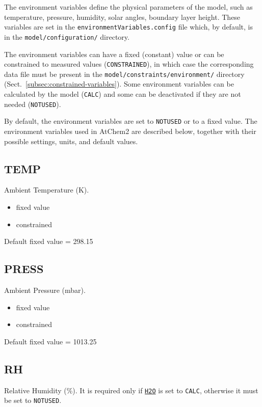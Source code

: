 The environment variables define the physical parameters of the model,
such as temperature, pressure, humidity, solar angles, boundary layer
height. These variables are set in the \texttt{environmentVariables.config}
file which, by default, is in the \texttt{model/configuration/}
directory.

The environment variables can have a fixed (constant) value or can be
constrained to measured values (\texttt{CONSTRAINED}), in which case
the corresponding data file must be present in the
\texttt{model/constraints/environment/} directory
(Sect.~\ref{subsec:constrained-variables}). Some environment variables
can be calculated by the model (\texttt{CALC}) and some can be
deactivated if they are not needed (\texttt{NOTUSED}).

By default, the environment variables are set to \texttt{NOTUSED} or
to a fixed value. The environment variables used in AtChem2 are
described below, together with their possible settings, units, and
default values.

\subsection{TEMP} \label{subsec:temp}

Ambient Temperature (K).

\begin{itemize}
\item fixed value
\item constrained
\end{itemize}

Default fixed value = 298.15

\subsection{PRESS} \label{subsec:press}

Ambient Pressure (mbar).

\begin{itemize}
\item fixed value
\item constrained
\end{itemize}

Default fixed value = 1013.25

\subsection{RH} \label{subsec:rh}

Relative Humidity (\%). It is required only if
\hyperref[subsec:h2o]{\texttt{H2O}} is set to \texttt{CALC}, otherwise
it must be set to \texttt{NOTUSED}.

